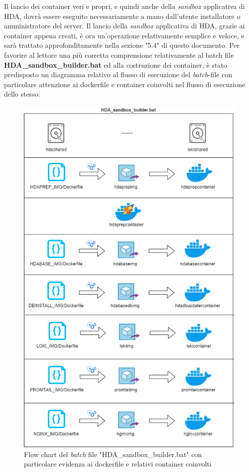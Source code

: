 Il lancio dei container veri e propri, e quindi anche della \textit{sandbox} applicativa di HDA, dovrà essere eseguito necessariamente a mano dall'utente installatore o amministratore del server.
Il lancio della \textit{sandbox} applicativa di HDA, grazie ai container appena creati, è ora un'operazione relativamente semplice e veloce, e sarà trattato approfonditamente nella sezione "5.4" di questo documento.
Per favorire al lettore una più corretta comprensione relativamente al batch file \textbf{HDA\_sandbox\_builder.bat} ed alla costruzione dei container, è stato predisposto un diagramma relativo al flusso di esecuzione del \textit{batch}-file con particolare attenzione ai dockerfile e container coinvolti nel flusso di esecuzione dello stesso:
\begin{figure}[!h]     
\centering 
    \includegraphics[width=0.7 \columnwidth]{immagini/flowchart/flow_chart_HDA_sandbox_builder} 
    \caption{Flow chart del \textit{batch} file "HDA\_sandbox\_builder.bat" con particolare evidenza ai dockerfile e relativi container coinvolti}
\end{figure}\\
\newpage
